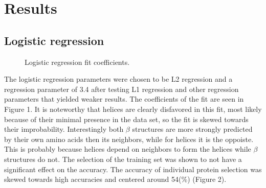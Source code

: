 \documentclass{article}
\begin{document}
\section{Results}

\subsection{Logistic regression}

\begin{figure}[h]
  \centering
  \caption{Logistic regression fit coefficients.}
\end{figure}

The logistic regression parameters were chosen to be L2 regression and a regression parameter of 3.4 after testing L1 regression and other regression parameters that yielded weaker results. The coefficients of the fit are seen in Figure 1. It is noteworthy that  helices are clearly disfavored in this fit, most likely because of their minimal presence in the data set, so the fit is skewed towards their improbability. Interestingly both $\beta$ structures are more strongly predicted by their own amino acids then its neighbors, while for helices it is the oppoiste. This is probably because helices depend on neighbors to form the helices while $\beta$ structures do not. The selection of the training set was shown to not have a significant effect on the accuracy. The accuracy of individual protein selection was skewed towards high accuracies and centered around 54(\%) (Figure 2).
\end{document}
